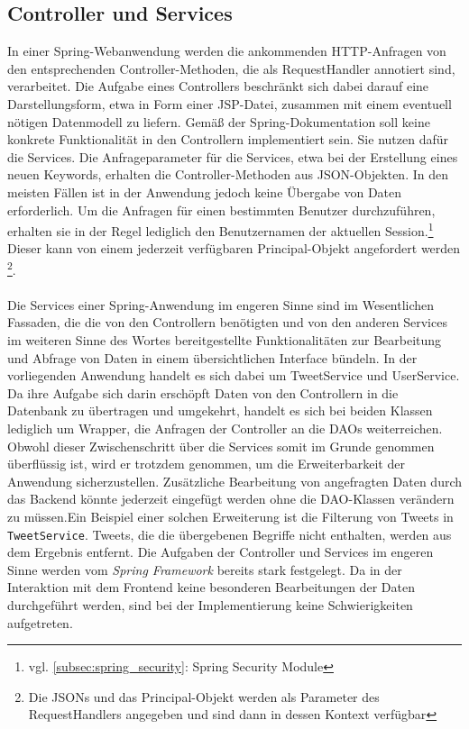 \subsection{Controller und Services}
In einer Spring-Webanwendung werden die ankommenden HTTP-Anfragen von den entsprechenden 
Controller-Methoden, die als RequestHandler annotiert sind, verarbeitet. Die Aufgabe eines 
Controllers beschränkt sich dabei darauf eine Darstellungsform, etwa in Form einer JSP-Datei, 
zusammen mit einem eventuell nötigen Datenmodell zu liefern. Gemäß der Spring-Dokumentation soll 
keine konkrete Funktionalität in den Controllern implementiert sein. Sie nutzen dafür die Services. 
Die Anfrageparameter für die Services, etwa bei der Erstellung eines neuen Keywords, erhalten die 
Controller-Methoden aus JSON-Objekten. In den meisten Fällen ist in der Anwendung jedoch keine 
Übergabe von Daten erforderlich. Um die Anfragen für einen bestimmten Benutzer durchzuführen, 
erhalten sie in der Regel lediglich den Benutzernamen der aktuellen Session.\footnote{vgl. 
\autoref{subsec:spring_security}: Spring Security Module} Dieser kann von einem jederzeit 
verfügbaren Principal-Objekt angefordert werden \footnote{Die JSONs und das Principal-Objekt werden 
als Parameter des RequestHandlers angegeben und sind dann in dessen Kontext verfügbar}.
\\\\
Die Services einer Spring-Anwendung im engeren Sinne sind im Wesentlichen Fassaden, die die von den 
Controllern benötigten und von den anderen Services im weiteren Sinne des Wortes bereitgestellte 
Funktionalitäten zur Bearbeitung und Abfrage von Daten in einem übersichtlichen Interface bündeln. 
In der vorliegenden Anwendung handelt es sich dabei um TweetService und UserService. Da ihre Aufgabe 
sich darin erschöpft Daten von den Controllern in die Datenbank zu übertragen und umgekehrt, handelt 
es sich bei beiden Klassen lediglich um Wrapper, die Anfragen der Controller an die DAOs 
weiterreichen. Obwohl dieser Zwischenschritt über die Services somit im Grunde genommen überflüssig 
ist, wird er trotzdem genommen, um die Erweiterbarkeit der Anwendung sicherzustellen. Zusätzliche 
Bearbeitung von angefragten Daten durch das Backend könnte jederzeit eingefügt werden ohne die DAO-Klassen verändern zu müssen.Ein Beispiel einer solchen Erweiterung ist die Filterung von Tweets in \texttt{TweetService}. 
Tweets, die die übergebenen Begriffe nicht enthalten, werden aus dem Ergebnis entfernt.
\newpage
Die Aufgaben der Controller und Services im engeren Sinne werden vom \textit{Spring Framework} 
bereits stark festgelegt. Da in der Interaktion mit dem Frontend keine besonderen Bearbeitungen der 
Daten durchgeführt werden, sind bei der Implementierung keine Schwierigkeiten aufgetreten.

